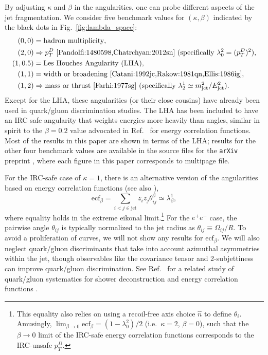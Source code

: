 \documentclass[11pt,letterpaper]{article}
\DeclareRobustCommand{\Fig}[1]{Fig.~\ref{#1}}
\DeclareRobustCommand{\Ref}[1]{Ref.~\cite{#1}}
\begin{document}
By adjusting $\kappa$ and $\beta$ in the angularities, one can probe different aspects of the jet fragmentation.  We consider five benchmark values for $(\kappa, \beta)$ indicated by the black dots in \Fig{fig:lambda_space}:
\begin{equation}
\label{eq:benchmarkang}
\begin{aligned}
(0,0) &= \text{hadron multiplicity},\\
(2,0) &\Rightarrow p_T^D \text{  \cite{Pandolfi:1480598,Chatrchyan:2012sn} (specifically $\lambda^{2}_{0} = (p_T^D)^2$)},\\
(1,0.5) & = \text{Les Houches Angularity (LHA)},\\
(1,1) &= \text{width or broadening \cite{Catani:1992jc,Rakow:1981qn,Ellis:1986ig}},\\
(1,2) & \Rightarrow \text{mass or thrust \cite{Farhi:1977sg}
  (specifically $\lambda^{1}_{2} \simeq m_{\rm jet}^2 / E_{\rm
    jet}^2$)}.
\end{aligned}
\end{equation}
Except for the LHA, these angularities (or their close cousins) have
already been used in quark/gluon discrimination studies.  The LHA has
been included to have an IRC safe angularity that weights energies
more heavily than angles, similar in spirit to the $\beta = 0.2$ value
advocated in \Ref{Larkoski:2013eya} for energy correlation
functions. Most of the results in this paper are shown in terms of the
LHA; results for the other four benchmark values are available in the
source files for the \texttt{arXiv} preprint \cite{ArXivSource}, where each figure in this paper
corresponds to multipage file.

For the IRC-safe case of $\kappa = 1$, there is an alternative version
of the angularities based on energy correlation functions \cite{Larkoski:2013eya} (see also \cite{Banfi:2004yd,Jankowiak:2011qa,Moult:2016cvt}),
\begin{equation}
\text{ecf}_\beta = \sum_{i < j \in \text{jet}} z_i z_j \theta_{ij}^\beta \simeq \lambda^{1}_{\beta},
\end{equation}
where equality holds in the extreme eikonal limit.\footnote{This equality also relies on using a recoil-free axis choice $\hat{n}$ to define $\theta_i$.  Amusingly, $\lim_{\beta \to 0} \text{ecf}_\beta = (1 - \lambda^{2}_{0})/2$ (i.e.~$\kappa = 2$, $\beta = 0$), such that the $\beta \to 0$ limit of the IRC-safe energy correlation functions corresponds to the IRC-unsafe $p_T^D$.}  For the $e^+ e^-$ case, the pairwise angle $\theta_{ij}$ is typically normalized to the jet radius as $\theta_{ij} \equiv \Omega_{ij}/R$.   To avoid a proliferation of curves, we will not show any results for $\text{ecf}_\beta$.  We will also neglect quark/gluon discriminants that take into account azimuthal asymmetries within the jet, though observables like the covariance tensor \cite{Gallicchio:2012ez} and 2-subjettiness \cite{Thaler:2010tr,Thaler:2011gf,Salam:2016yht} can improve quark/gluon discrimination.  See \Ref{FerreiradeLima:2016gcz} for a related study of quark/gluon systematics for shower deconstruction \cite{Soper:2011cr,Soper:2012pb,Soper:2014rya} and energy correlation functions \cite{Larkoski:2013eya}.
\end{document}
